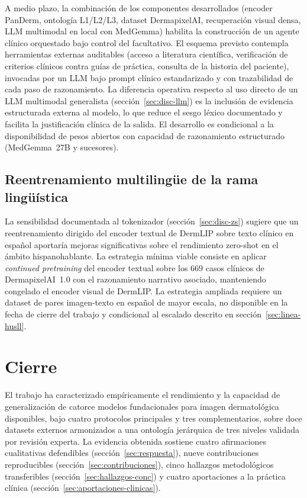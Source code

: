 A medio plazo, la combinación de los componentes desarrollados
(encoder PanDerm, ontología L1/L2/L3, dataset DermapixelAI,
recuperación visual densa, LLM multimodal en local con MedGemma)
habilita la construcción de un agente clínico orquestado bajo
control del facultativo. El esquema previsto contempla
herramientas externas auditables (acceso a literatura científica,
verificación de criterios clínicos contra guías de práctica,
consulta de la historia del paciente), invocadas por un LLM bajo
prompt clínico estandarizado y con trazabilidad de cada paso de
razonamiento. La diferencia operativa respecto al uso directo de
un LLM multimodal generalista
(secci\'on~\ref{sec:disc-llm}) es la inclusión de evidencia
estructurada externa al modelo, lo que reduce el sesgo léxico
documentado y facilita la justificación clínica de la salida. El
desarrollo es condicional a la disponibilidad de pesos abiertos
con capacidad de razonamiento estructurado (MedGemma~27B y
sucesores).

\subsection{Reentrenamiento multilingüe de la rama lingüística}
\label{sec:linea-multilingual}

La sensibilidad documentada al tokenizador
(secci\'on~\ref{sec:disc-zs}) sugiere que un reentrenamiento dirigido del
encoder textual de DermLIP sobre texto clínico en español aportaría
mejoras significativas sobre el rendimiento zero-shot en el ámbito
hispanohablante. La estrategia mínima viable consiste en aplicar
\emph{continued pretraining} del encoder textual sobre los
$669$ casos clínicos de DermapixelAI~1.0 con el razonamiento
narrativo asociado, manteniendo congelado el encoder visual de
DermLIP. La estrategia ampliada requiere un dataset de pares
imagen-texto en español de mayor escala, no disponible en la fecha
de cierre del trabajo y condicional al escalado descrito en
secci\'on~\ref{sec:linea-husll}.

\section{Cierre}
\label{sec:cierre}

El trabajo ha caracterizado empíricamente el rendimiento y la
capacidad de generalización de catorce modelos fundacionales para
imagen dermatológica disponibles, bajo cuatro protocolos
principales y tres complementarios, sobre doce datasets externos
armonizados a una ontología jerárquica de tres niveles validada
por revisión experta. La evidencia obtenida sostiene cuatro
afirmaciones cualitativas defendibles (secci\'on~\ref{sec:respuesta}),
nueve contribuciones reproducibles (secci\'on~\ref{sec:contribuciones}),
cinco hallazgos metodológicos transferibles
(secci\'on~\ref{sec:hallazgos-conc}) y cuatro aportaciones a la práctica
clínica (secci\'on~\ref{sec:aportaciones-clinicas}).

